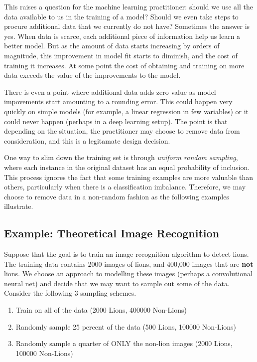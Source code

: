 \documentclass[twoside]{article}
\begin{document}
This raises a question for the machine learning practitioner: should we use all the data available to us in the training of a model? Should we even take steps to procure additional data that we currently do not have? Sometimes the answer is yes. When data is scarce, each additional piece of information help us learn a better model. But as the amount of data starts increasing by orders of magnitude, this improvement in model fit starts to diminish, and the cost of training it increases. At some point the cost of obtaining and training on more data exceeds the value of the improvements to the model.

There is even a point where additional data adds zero value as model impovements start amounting to a rounding error. This could happen very quickly on simple models (for example, a linear regression in few variables) or it could never happen (perhaps in a deep learning setup). The point is that depending on the situation, the practitioner may choose to remove data from consideration, and this is a legitamate design decision.

One way to slim down the training set is through \textit{uniform random sampling}, where each instance in the original dataset has an equal probability of inclusion. This process ignores the fact that some training examples are more valuable than others, particularly when there is a classification imbalance. Therefore, we may choose to remove data in a non-random fashion as the following examples illustrate.

\subsection{Example: Theoretical Image Recognition}
\label{section:lion}

Suppose that the goal is to train an image recognition algorithm to detect lions. The training data contains 2000 images of lions, and 400,000 images that are \textbf{not} lions. We choose an approach to modelling these images (perhaps a convolutional neural net) and decide that we may want to sample out some of the data. Consider the following 3 sampling schemes.

\begin{enumerate}[label=(\Alph*)]
\item \label{train_on_all_data} Train on all of the data (2000 Lions, 400000 Non-Lions)
\item \label{train_on_randomly_sampled}Randomly sample 25 percent of the data (500 Lions, 100000 Non-Lions)
\item \label{training_on_non_rs} Randomly sample a quarter of ONLY the non-lion images (2000 Lions, 100000 Non-Lions)
\end{enumerate}
\end{document}

